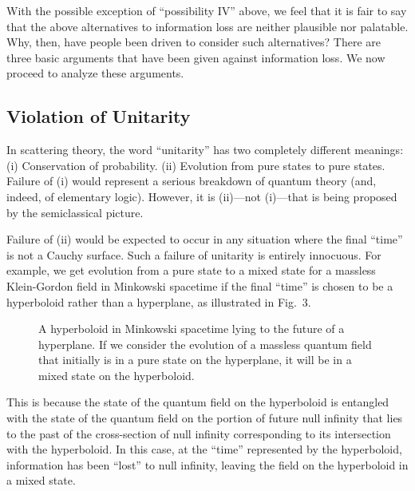 \documentclass[12pt,nofootinbib,amsmath,amssymb,amsfonts,aps,prd,groupedaddress]{revtex4-1}
\begin{document}
With the possible exception of ``possibility IV'' above, we feel that it is fair
to say that the above alternatives to information loss are neither plausible nor
palatable. Why, then, have people been driven to consider such alternatives?
There are three basic arguments that have been given against information loss.
We now proceed to analyze these arguments.

\medskip


\subsection{Violation of Unitarity} \label{unit}

In scattering theory, the word ``unitarity'' has two completely different
meanings: (i) Conservation of probability. (ii) Evolution from pure states to
pure states.  Failure of (i) would represent a serious breakdown of quantum
theory (and, indeed, of elementary logic). However, it is (ii)---not (i)---that
is being proposed by the semiclassical picture. 

Failure of (ii) would be expected to occur in any situation where the final
``time'' is not a Cauchy surface. Such a failure of unitarity is entirely
innocuous.  For example, we get evolution from a pure state to a mixed state for
a massless Klein-Gordon field in Minkowski spacetime if the final ``time'' is
chosen to be a hyperboloid rather than a hyperplane, as illustrated in Fig.~3.
\begin{figure}[ht]
\centering
{}
\caption{A hyperboloid in Minkowski spacetime lying to the future of a hyperplane. If we consider
the evolution of a massless quantum field that initially is in a pure state on the hyperplane, it will be 
in a mixed state on the hyperboloid.}
\end{figure}
This is because the state of the quantum field on the hyperboloid is entangled
with the state of the quantum field on the portion of future null infinity that
lies to the past of the cross-section of null infinity corresponding to its
intersection with the hyperboloid. In this case, at the ``time'' represented by
the hyperboloid, information has been ``lost'' to null infinity, leaving the
field on the hyperboloid in a mixed state. 
\end{document}
